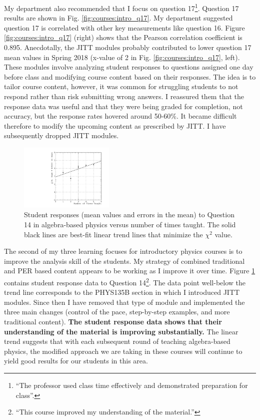 \documentclass[../../main.tex]{subfiles}
\begin{document}
My department also recommended that I focus on question 17\footnote{``The professor used class time effectively and demonstrated preparation for class''.}.  Question 17 results are shown in Fig. \ref{fig:courses:intro_q17}.  My department suggested question 17 is correlated with other key measurements like question 16.  Figure \ref{fig:courses:intro_q17} (right) shows that the Pearson correlation coefficient is 0.895.  Anecdotally, the JITT modules probably contributed to lower question 17 mean values in Spring 2018 (x-value of 2 in Fig. \ref{fig:courses:intro_q17}, left).  These modules involve analyzing student responses to questions assigned one day before class and modifying course content based on their responses.  The idea is to tailor course content, however, it was common for struggling students to not respond rather than risk submitting wrong answers.  I reassured them that the response data was useful and that they were being graded for completion, not accuracy, but the response rates hovered around 50-60\%.  It became difficult therefore to modify the upcoming content as prescribed by JITT.  I have subsequently dropped JITT modules.  \\ \hspace{0.1cm}

\begin{figure}
\centering
\includegraphics[width=0.4\textwidth]{Q14_algebra_based.pdf}
\caption{\label{fig:courses:intro_q14}  Student responses (mean values and errors in the mean) to Question 14 in algebra-based physics versus number of times taught.  The solid black lines are best-fit linear trend lines that minimize the $\chi^2$ value.}
\end{figure}

The second of my three learning focuses for introductory physics courses is to improve the analysis skill of the students.  My strategy of combined traditional and PER based content appears to be working as I improve it over time.  Figure \ref{fig:courses:intro_q14} contains student response data to Question 14\footnote{``This course  improved my understanding of the material.''}.  The data point well-below the trend line corresponds to the PHYS135B section in which I introduced JITT modules.  Since then I have removed that type of module and implemented the three main changes (control of the pace, step-by-step examples, and more traditional content).  \textbf{The student response data shows that their understanding of the material is improving substantially.}  The linear trend suggests that with each subsequent round of teaching algebra-based physics, the modified approach we are taking in these courses will continue to yield good results for our students in this area.  \\ \hspace{0.1cm}
\end{document}
